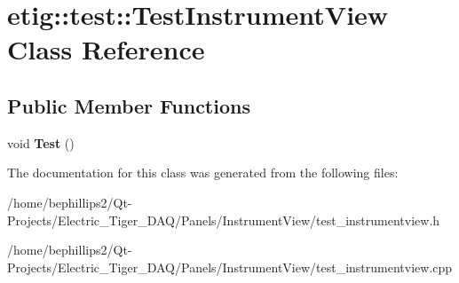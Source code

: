 \hypertarget{classetig_1_1test_1_1_test_instrument_view}{}\section{etig\+:\+:test\+:\+:Test\+Instrument\+View Class Reference}
\label{classetig_1_1test_1_1_test_instrument_view}
\subsection*{Public Member Functions}
\begin{DoxyCompactItemize}
\item 
void {\bfseries Test} ()\hypertarget{classetig_1_1test_1_1_test_instrument_view_acca5fdef980dd4941b1d935de6bceac9}{}\label{classetig_1_1test_1_1_test_instrument_view_acca5fdef980dd4941b1d935de6bceac9}

\end{DoxyCompactItemize}


The documentation for this class was generated from the following files\+:\begin{DoxyCompactItemize}
\item 
/home/bephillips2/\+Qt-\/\+Projects/\+Electric\+\_\+\+Tiger\+\_\+\+D\+A\+Q/\+Panels/\+Instrument\+View/test\+\_\+instrumentview.\+h\item 
/home/bephillips2/\+Qt-\/\+Projects/\+Electric\+\_\+\+Tiger\+\_\+\+D\+A\+Q/\+Panels/\+Instrument\+View/test\+\_\+instrumentview.\+cpp\end{DoxyCompactItemize}
